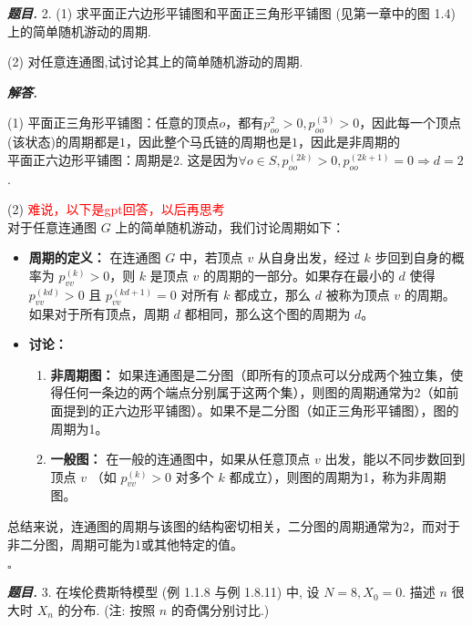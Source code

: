 \documentclass[10pt, a4paper, oneside]{ctexart}
\newenvironment{problem}{\begin{framed}\par\noindent\textbf{\textit{题目. }}}{\end{framed}\par}
\newenvironment{solution}{%
  \par\noindent\textbf{\textit{解答. }}\ignorespaces
}{%
  \hfill\ensuremath{\square}\par %
}
\begin{document}
\begin{problem}
    2. (1) 求平面正六边形平铺图和平面正三角形平铺图 (见第一章中的图 1.4) 上的简单随机游动的周期.

(2) 对任意连通图,试讨论其上的简单随机游动的周期.
\end{problem}
\begin{solution}
    (1) 平面正三角形平铺图：任意的顶点$o$，都有$p_{oo}^{2}>0,p_{oo}^{(3)}>0$，因此每一个顶点(该状态)的周期都是$1$，因此整个马氏链的周期也是$1$，因此是非周期的\\
    平面正六边形平铺图：周期是$2$. 这是因为$\forall o\in S, p_{oo}^{(2k)}>0,p_{oo}^{(2k+1)}=0\Rightarrow d=2$.

    (2) \textcolor{red}{难说，以下是gpt回答，以后再思考}\\
    对于任意连通图 \( G \) 上的简单随机游动，我们讨论周期如下：

\begin{itemize}
    \item \textbf{周期的定义：}  
    在连通图 \( G \) 中，若顶点 \( v \) 从自身出发，经过 \( k \) 步回到自身的概率为 \( p_{vv}^{(k)} > 0 \)，则 \( k \) 是顶点 \( v \) 的周期的一部分。如果存在最小的 \( d \) 使得 \( p_{vv}^{(kd)} > 0 \) 且 \( p_{vv}^{(kd+1)} = 0 \) 对所有 \( k \) 都成立，那么 \( d \) 被称为顶点 \( v \) 的周期。如果对于所有顶点，周期 \( d \) 都相同，那么这个图的周期为 \( d \)。
    
    \item \textbf{讨论：}
    \begin{enumerate}
        \item \textbf{非周期图：}  
        如果连通图是二分图（即所有的顶点可以分成两个独立集，使得任何一条边的两个端点分别属于这两个集），则图的周期通常为2（如前面提到的正六边形平铺图）。如果不是二分图（如正三角形平铺图），图的周期为1。
        
        \item \textbf{一般图：}  
        在一般的连通图中，如果从任意顶点 \( v \) 出发，能以不同步数回到顶点 \( v \) （如 \( p_{vv}^{(k)} > 0 \) 对多个 \( k \) 都成立），则图的周期为1，称为非周期图。
    \end{enumerate}
\end{itemize}

总结来说，连通图的周期与该图的结构密切相关，二分图的周期通常为2，而对于非二分图，周期可能为1或其他特定的值。

\end{solution}
\begin{problem}
    3. 在埃伦费斯特模型 (例 1.1.8 与例 1.8.11) 中, 设 \( N = 8,X_0=0 \). 描述 \( n \) 很大时 \( {X}_{n} \) 的分布. (注: 按照 \( n \) 的奇偶分别讨比.)
\end{problem}
\end{document}
